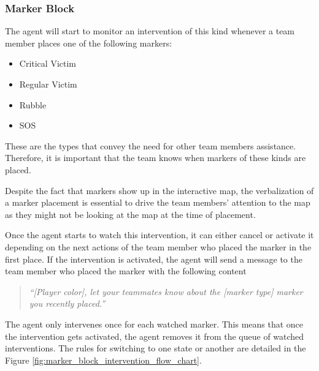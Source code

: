 \subsubsection{Marker Block}

The agent will start to monitor an intervention of this kind whenever a team member places one of the following markers:
\begin{itemize}
	\item Critical Victim
	\item Regular Victim
	\item Rubble
	\item SOS
\end{itemize}

These are the types that convey the need for other team members assistance. Therefore, it is important that the team knows when markers of these kinds are placed. 

Despite the fact that markers show up in the interactive map, the verbalization of a marker placement is essential to drive the team members' attention to the map as they might not be looking at the map at the time of placement. 

Once the agent starts to watch this intervention, it can either cancel or activate it depending on the next actions of the team member who placed the marker in the first place. If the intervention is activated, the agent will send a message to the team member who placed the marker with the following content

\begin{quote} 
    \centering 
    \emph{``[Player color], let your teammates know about the [marker type] marker you recently placed.''}
\end{quote}

The agent only intervenes once for each watched marker. This means that once the intervention gets activated, the agent removes it from the queue of watched interventions. The rules for switching to one state or another are detailed in the Figure \ref{fig:marker_block_intervention_flow_chart}.

